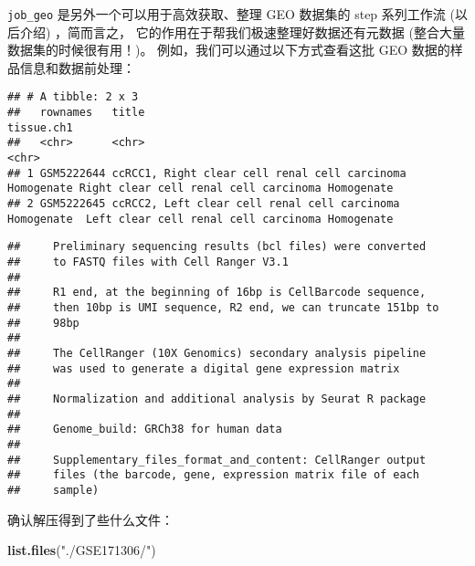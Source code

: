 \documentclass[
]{article}
\newenvironment{Shaded}{\begin{snugshade}}{\end{snugshade}}
\newcommand{\KeywordTok}[1]{\textcolor[rgb]{0.13,0.29,0.53}{\textbf{#1}}}
\newcommand{\NormalTok}[1]{#1}
\newcommand{\OperatorTok}[1]{\textcolor[rgb]{0.81,0.36,0.00}{\textbf{#1}}}
\newcommand{\StringTok}[1]{\textcolor[rgb]{0.31,0.60,0.02}{#1}}
\begin{document}
\texttt{job\_geo} 是另外一个可以用于高效获取、整理 GEO 数据集的 step 系列工作流 (以后介绍) ，简而言之，
它的作用在于帮我们极速整理好数据还有元数据 (整合大量数据集的时候很有用！)。
例如，我们可以通过以下方式查看这批 GEO 数据的样品信息和数据前处理：

\begin{Shaded}
\end{Shaded}

\begin{verbatim}
## # A tibble: 2 x 3
##   rownames   title                                                    tissue.ch1                                      
##   <chr>      <chr>                                                    <chr>                                           
## 1 GSM5222644 ccRCC1, Right clear cell renal cell carcinoma Homogenate Right clear cell renal cell carcinoma Homogenate
## 2 GSM5222645 ccRCC2, Left clear cell renal cell carcinoma Homogenate  Left clear cell renal cell carcinoma Homogenate
\end{verbatim}

\begin{Shaded}
\end{Shaded}

\begin{verbatim}
##     Preliminary sequencing results (bcl files) were converted
##     to FASTQ files with Cell Ranger V3.1
## 
##     R1 end, at the beginning of 16bp is CellBarcode sequence,
##     then 10bp is UMI sequence, R2 end, we can truncate 151bp to
##     98bp
## 
##     The CellRanger (10X Genomics) secondary analysis pipeline
##     was used to generate a digital gene expression matrix
## 
##     Normalization and additional analysis by Seurat R package
## 
##     Genome_build: GRCh38 for human data
## 
##     Supplementary_files_format_and_content: CellRanger output
##     files (the barcode, gene, expression matrix file of each
##     sample)
\end{verbatim}

确认解压得到了些什么文件：

\begin{Shaded}
\begin{Highlighting}[]
\KeywordTok{list.files}\NormalTok{(}\StringTok{"./GSE171306/"}\NormalTok{)}
\end{Highlighting}
\end{Shaded}
\end{document}

